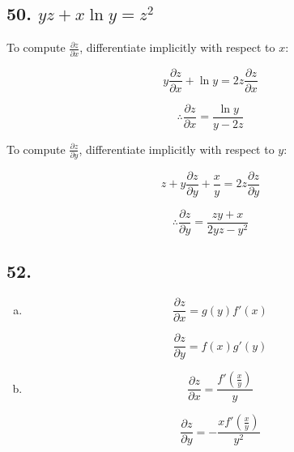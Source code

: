 \documentclass{article}
\begin{document}
    \subsection*{50. $yz + x\ln y = z^2$}
    





    To compute $\frac{\partial z}{\partial x}$, differentiate implicitly with respect to $x$:

    $$y\frac{\partial z}{\partial x} + \ln y = 2z\frac{\partial z}{\partial x}$$

    $$\therefore \frac{\partial z}{\partial x} = \frac{\ln y}{y - 2z}$$

    To compute $\frac{\partial z}{\partial y}$, differentiate implicitly with respect to $y$:

    $$z + y\frac{\partial z}{\partial y} + \frac{x}{y} = 2z \frac{\partial z}{\partial y}$$

    $$\therefore \frac{\partial z}{\partial y} = \frac{zy + x}{2yz - y^2}$$


    \subsection*{52.}

    \begin{enumerate}[(a)]
        \item 
        $$\frac{\partial z}{\partial x} = g(y)f'(x)$$

        $$\frac{\partial z}{\partial y} = f(x)g'(y)$$

        \item 
        $$\frac{\partial z}{\partial x} = \frac{f'(\frac x y)}{y}$$

        $$\frac{\partial z}{\partial y} = -\frac{x f'(\frac x y)}{y^2}$$
    \end{enumerate}
\end{document}
